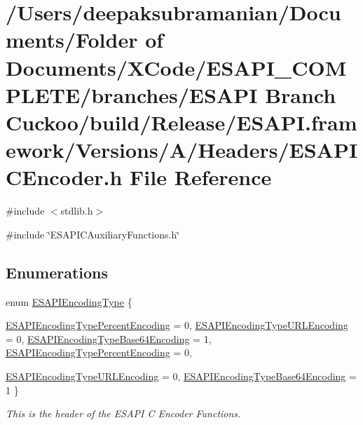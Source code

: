 \hypertarget{a00008}{
\section{/Users/deepaksubramanian/Documents/Folder of Documents/XCode/ESAPI\_\-COMPLETE/branches/ESAPI Branch Cuckoo/build/Release/ESAPI.framework/Versions/A/Headers/ESAPICEncoder.h File Reference}
\label{d4/dee/a00008}
}
{\ttfamily \#include $<$stdlib.h$>$}\par
{\ttfamily \#include \char`\"{}ESAPICAuxiliaryFunctions.h\char`\"{}}\par
\subsection*{Enumerations}
\begin{DoxyCompactItemize}
\item 
enum \hyperlink{a00008_af4b9f1c8f83fc1f697a6c6fb2ba5749c}{ESAPIEncodingType} \{ \par
\hyperlink{a00008_af4b9f1c8f83fc1f697a6c6fb2ba5749ca6b143b8248f2d6b9dc93b178c5a2df66}{ESAPIEncodingTypePercentEncoding} =  0, 
\hyperlink{a00008_af4b9f1c8f83fc1f697a6c6fb2ba5749ca061d2b58fed020025c2b059ed1d90759}{ESAPIEncodingTypeURLEncoding} =  0, 
\hyperlink{a00008_af4b9f1c8f83fc1f697a6c6fb2ba5749cab30d4a386be2c9db1ac213bca008c547}{ESAPIEncodingTypeBase64Encoding} =  1, 
\hyperlink{a00009_af4b9f1c8f83fc1f697a6c6fb2ba5749ca6b143b8248f2d6b9dc93b178c5a2df66}{ESAPIEncodingTypePercentEncoding} =  0, 
\par
\hyperlink{a00009_af4b9f1c8f83fc1f697a6c6fb2ba5749ca061d2b58fed020025c2b059ed1d90759}{ESAPIEncodingTypeURLEncoding} =  0, 
\hyperlink{a00009_af4b9f1c8f83fc1f697a6c6fb2ba5749cab30d4a386be2c9db1ac213bca008c547}{ESAPIEncodingTypeBase64Encoding} =  1
 \}
\begin{DoxyCompactList}\small\item\em This is the header of the ESAPI C Encoder Functions. \end{DoxyCompactList}\end{DoxyCompactItemize}
